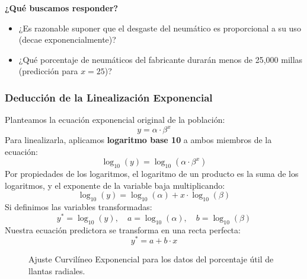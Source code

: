 \documentclass[11pt,a4paper]{article}
\begin{document}
    \textbf{¿Qué buscamos responder?}
    \begin{itemize}
        \item ¿Es razonable suponer que el desgaste del neumático es proporcional a su uso (decae exponencialmente)?
        \item ¿Qué porcentaje de neumáticos del fabricante durarán menos de 25,000 millas (predicción para $x = 25$)?
    \end{itemize}

    \subsubsection*{Deducción de la Linealización Exponencial}
    Planteamos la ecuación exponencial original de la población:
    \[ y = \alpha \cdot \beta^x \]
    Para linealizarla, aplicamos \textbf{logaritmo base 10} a ambos miembros de la ecuación:
    \[ \log_{10}(y) = \log_{10}(\alpha \cdot \beta^x) \]
    Por propiedades de los logaritmos, el logaritmo de un producto es la suma de los logaritmos, y el exponente de la variable baja multiplicando:
    \begin{equation}
        \log_{10}(y) = \log_{10}(\alpha) + x \cdot \log_{10}(\beta)
    \end{equation}
    Si definimos las variables transformadas:
    \[ y^* = \log_{10}(y), \quad a = \log_{10}(\alpha), \quad b = \log_{10}(\beta) \]
    Nuestra ecuación predictora se transforma en una recta perfecta:
    \[ y^* = a + b \cdot x \]

    \begin{figure}[htbp]
        \centering
        \caption{Ajuste Curvilíneo Exponencial para los datos del porcentaje útil de llantas radiales.}
        \label{fig:exponencial}
    \end{figure}
\end{document}
